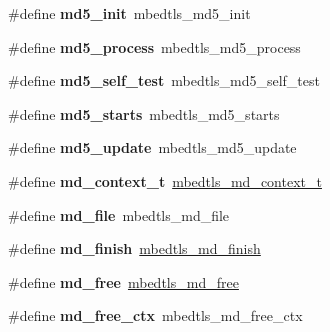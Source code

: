 \begin{DoxyCompactItemize}
\mbox{\label{compat-1_83_8h_af7853ca1de489113a86f9bdaf3dbe5b8}} 
\#define {\bfseries md5\+\_\+init}~mbedtls\+\_\+md5\+\_\+init
\item 
\mbox{\label{compat-1_83_8h_a135f3d6844724dafa7ea83407eccda86}} 
\#define {\bfseries md5\+\_\+process}~mbedtls\+\_\+md5\+\_\+process
\item 
\mbox{\label{compat-1_83_8h_a7e4760d77a74c17f21371f3822e97acb}} 
\#define {\bfseries md5\+\_\+self\+\_\+test}~mbedtls\+\_\+md5\+\_\+self\+\_\+test
\item 
\mbox{\label{compat-1_83_8h_a4415a6251f382dec8ae29cffc93b2e63}} 
\#define {\bfseries md5\+\_\+starts}~mbedtls\+\_\+md5\+\_\+starts
\item 
\mbox{\label{compat-1_83_8h_abe467932b7e2f76dbfcb24ff4afe6127}} 
\#define {\bfseries md5\+\_\+update}~mbedtls\+\_\+md5\+\_\+update
\item 
\mbox{\label{compat-1_83_8h_a1b9037355545fa95369c2bc37f9603c0}} 
\#define {\bfseries md\+\_\+context\+\_\+t}~\mbox{\hyperlink{structmbedtls__md__context__t}{mbedtls\+\_\+md\+\_\+context\+\_\+t}}
\item 
\mbox{\label{compat-1_83_8h_afbcc7199db4fb5d1052554c2b22dad4c}} 
\#define {\bfseries md\+\_\+file}~mbedtls\+\_\+md\+\_\+file
\item 
\mbox{\label{compat-1_83_8h_ac0da6eace442e01eed25587466570f9a}} 
\#define {\bfseries md\+\_\+finish}~\mbox{\hyperlink{md_8h_adf77ab9b0f117367883988ee5f0af1f4}{mbedtls\+\_\+md\+\_\+finish}}
\item 
\mbox{\label{compat-1_83_8h_ad622baa8c5879fb4bb6f0face5d3f6d9}} 
\#define {\bfseries md\+\_\+free}~\mbox{\hyperlink{md_8h_af3248ddb6ad05035292fa92ac4af2587}{mbedtls\+\_\+md\+\_\+free}}
\item 
\mbox{\label{compat-1_83_8h_af7543d69085d097b27b098231742c8eb}} 
\#define {\bfseries md\+\_\+free\+\_\+ctx}~mbedtls\+\_\+md\+\_\+free\+\_\+ctx
\item 
\mbox{\label{compat-1_83_8h_a197c84fb459a39c7926045844c1d6214}} 

\end{DoxyCompactItemize}
